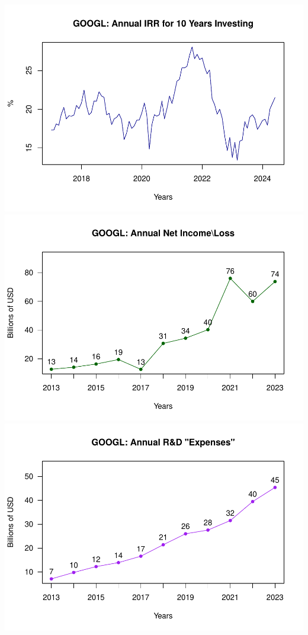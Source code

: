 \documentclass[
]{book}
\begin{document}
\includegraphics{_main_files/figure-latex/unnamed-chunk-1-21.pdf}
\includegraphics{_main_files/figure-latex/unnamed-chunk-1-22.pdf}
\includegraphics{_main_files/figure-latex/unnamed-chunk-1-23.pdf}
\end{document}
